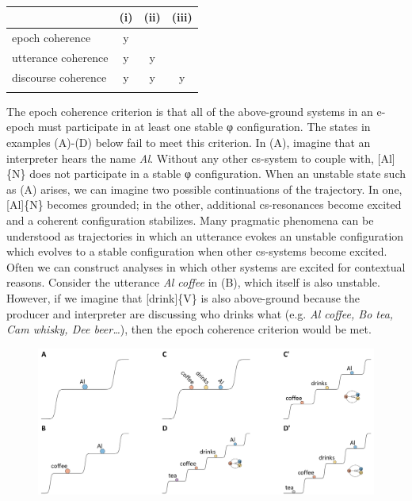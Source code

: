 \begin{table}
\begin{tabularx}{.8\textwidth}{XCCC}
\lsptoprule
& (i) & (ii) & (iii)\\
\midrule 
\raggedleft epoch coherence & y &  & \\
\raggedleft utterance coherence & y & y & \\
\raggedleft discourse coherence & y & y & y\\
\lspbottomrule
\end{tabularx}
\caption{\missingcaption}\label{tab:6:1}
\end{table}
  The epoch coherence criterion is that all of the above-ground systems in an e-epoch must participate in at least one stable φ configuration. The states in examples (A)-(D) below fail to meet this criterion. In (A), imagine that an interpreter hears the name \textit{Al}. Without any other cs-system to couple with, [Al]\{N\} does not participate in a stable φ configuration. When an unstable state such as (A) arises, we can imagine two possible continuations of the trajectory. In one, [Al]\{N\} becomes grounded; in the other, additional cs-resonances become excited and a coherent configuration stabilizes. Many pragmatic phenomena can be understood as trajectories in which an utterance evokes an unstable configuration which evolves to a stable configuration when other cs-systems become excited. Often we can construct analyses in which other systems are excited for contextual reasons. Consider the utterance \textit{Al coffee} in (B), which itself is also unstable. However, if we imagine that [drink]\{V\} is also above-ground because the producer and interpreter are discussing who drinks what (e.g. \textit{Al coffee, Bo tea, Cam whisky, Dee beer…}), then the epoch coherence criterion would be met.

  
\begin{figure}
\includegraphics[width=\textwidth]{figures/Tilsen-img124.png}
\caption{\missingcaption}
\label{fig:6:5}
\end{figure}
 

